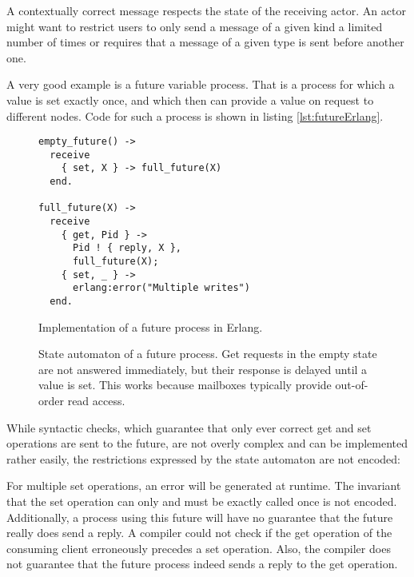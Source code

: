 A contextually correct message respects the state of the receiving actor.
An actor might want to restrict users to only send a message of a given kind a limited number of times or requires that a message of a given type is sent before another one.


A very good example is a future variable process.
That is a process for which a value is set exactly once, and which then can provide a value on request to different nodes.
Code for such a process is shown in listing \ref{lst:futureErlang}.


\begin{figure}[ht]
\begin{minipage}[c]{0.48\linewidth}
    \begin{lstlisting}
empty_future() ->
  receive
    { set, X } -> full_future(X)
  end.

full_future(X) ->
  receive
    { get, Pid } ->
      Pid ! { reply, X },
      full_future(X);
    { set, _ } ->
      erlang:error("Multiple writes")
  end.
    \end{lstlisting}
    \caption{Implementation of a future process in Erlang\cite{fowlerSpecialDeliveryProgramming2023}.}
    \label{lst:futureErlang}
\end{minipage}
\hfill
\begin{minipage}[c]{0.48\linewidth}
    \caption{
        State automaton of a future process.
        Get requests in the empty state are not answered immediately, but their response is delayed until a value is set.
        This works because mailboxes typically provide out-of-order read access.
    }
    \label{fig:futureStateAutomaton}
\end{minipage}
\end{figure}

While syntactic checks, which guarantee that only ever correct get and set operations are sent to the future, are not overly complex and can be implemented rather easily, the restrictions expressed by the state automaton are not encoded:

For multiple set operations, an error will be generated at runtime.
The invariant that the set operation can only and must be exactly called once is not encoded.
Additionally, a process using this future will have no guarantee that the future really does send a reply.
A compiler could not check if the get operation of the consuming client erroneously precedes a set operation.
Also, the compiler does not guarantee that the future process indeed sends a reply to the get operation.

